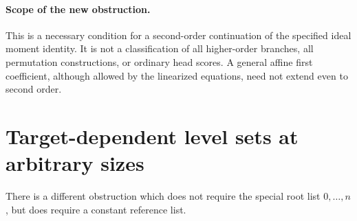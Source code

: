 \documentclass[11pt]{article}
\begin{document}
\paragraph{Scope of the new obstruction.}
This is a necessary condition for a second-order continuation of the
specified ideal moment identity. It is not a classification of all
higher-order branches, all permutation constructions, or ordinary
head scores. A general affine first coefficient, although allowed
by the linearized equations, need not extend even to second order.

\section{Target-dependent level sets at arbitrary sizes}

There is a different obstruction which does not require the special
root list $0,\ldots,n$, but does require a constant reference list.
\end{document}
